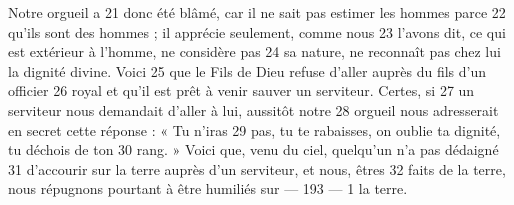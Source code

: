 Notre orgueil a	 
21	 	donc été blâmé, car il ne sait pas estimer les hommes parce	 
22	 	qu'ils sont des hommes ; il apprécie seulement, comme nous	 
23	 	l'avons dit, ce qui est extérieur à l'homme, ne considère pas	 
24	 	sa nature, ne reconnaît pas chez lui la dignité divine. Voici	 
25	 	que le Fils de Dieu refuse d'aller auprès du fils d'un officier	 
26	 	royal et qu'il est prêt à venir sauver un serviteur. Certes, si	 
27	 	un serviteur nous demandait d'aller à lui, aussitôt notre	 
28	 	orgueil nous adresserait en secret cette réponse : « Tu n'iras	 
29	 	pas, tu te rabaisses, on oublie ta dignité, tu déchois de ton	 
30	 	rang. » Voici que, venu du ciel, quelqu'un n'a pas dédaigné	 
31	 	d'accourir sur la terre auprès d'un serviteur, et nous, êtres	 
32	 	faits de la terre, nous répugnons pourtant à être humiliés sur	 
 	--- 193 ---	 
1	 	la terre.